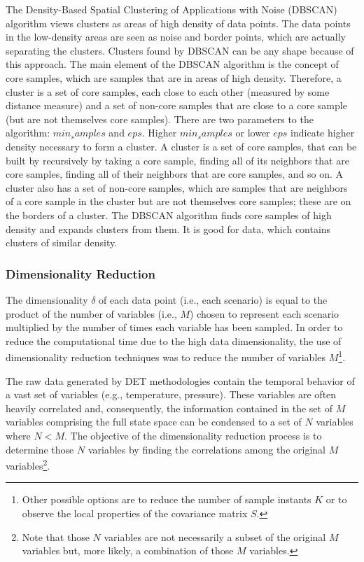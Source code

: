 The Density-Based Spatial Clustering of Applications with Noise (DBSCAN) algorithm views clusters as areas of high density of data points. The data points in the low-density areas are seen as noise and border points, which are actually separating the clusters. Clusters found by DBSCAN can be any shape because of this approach. 
The main element of the DBSCAN algorithm is the concept of core samples, which are samples that are in areas of high density. Therefore, a cluster is a set of core samples, each close to each other (measured by some distance measure) and a set of non-core samples that are close to a core sample (but are not themselves core samples). There are two parameters to the algorithm: $min_samples$ and $eps$. Higher $min_samples$ or lower $eps$ indicate higher density necessary to form a cluster. 
A cluster is a set of core samples, that can be built by recursively by taking a core sample, finding all of its neighbors that are core samples, finding all of their neighbors that are core samples, and so on. A cluster also has a set of non-core samples, which are samples that are neighbors of a core sample in the cluster but are not themselves core samples; these are on the borders of a cluster. 
The DBSCAN algorithm finds core samples of high density and expands clusters from them. It is good for data, which contains clusters of similar density. 

\subsubsection{Dimensionality Reduction}
\label{sec:6DimRed.section}

The dimensionality $\delta$ of each data point (i.e., each scenario) is equal to the product of the number of variables (i.e., $M$) chosen to represent each scenario multiplied by the number of times each variable has been sampled.
In order to reduce the computational time due to the high data dimensionality, the use of dimensionality reduction techniques was to reduce the number of variables $M$\footnote{Other possible options are to reduce the number of sample instants $K$ or to observe the local properties of the covariance matrix $S$.}.

The raw data generated by DET methodologies contain the temporal behavior of a vast set of variables (e.g., temperature, pressure). These variables are often heavily correlated and, consequently, the information contained in the set of $M$ variables comprising the full state space can be condensed to a set of $N$ variables where $N <M$. The objective of the dimensionality reduction process is to determine those $N$ variables by finding the correlations among the original $M$ variables\footnote{Note that those $N$ variables are not necessarily a subset of the original $M$ variables but, more likely, a combination of those $M$ variables.}.

